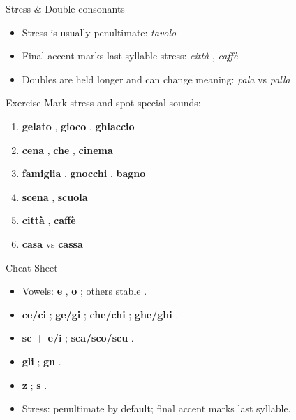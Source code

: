 \blueheader
\begin{frame}{Stress \& Double consonants}
\begin{itemize}
  \item Stress is usually penultimate: \textit{tavolo} \textipa{[ta"VOlo]}
  \item Final accent marks last-syllable stress: \textit{citt\`a} \textipa{[tSit"ta]}, \textit{caff\`e} \textipa{[kaf"fE]}
  \item Doubles are held longer and can change meaning: \textit{pala} \textipa{["pala]} vs \textit{palla} \textipa{["palla]}
\end{itemize}

\medskip
{}
\end{frame}

\cyanheader
\begin{frame}{Exercise}
Mark stress and spot special sounds:
\begin{enumerate}
  \item \textbf{gelato} , \textbf{gioco} \textipa{["dZOko]}, \textbf{ghiaccio} \textipa{["gjattSo]}
  \item \textbf{cena} \textipa{["tSe:na]}, \textbf{che} \textipa{[ke]}, \textbf{cinema} \textipa{["tSinema]}
  \item \textbf{famiglia} \textipa{[fa"miLa]}, \textbf{gnocchi} \textipa{["JOkki]}, \textbf{bagno} \textipa{["baJo]}
  \item \textbf{scena} \textipa{["Se:na]}, \textbf{scuola} \textipa{["skwOla]}
  \item \textbf{citt\`a} \textipa{[tSit"ta]}, \textbf{caff\`e} \textipa{[kaf"fE]}
  \item \textbf{casa} \textipa{["ka:za]} vs \textbf{cassa} \textipa{["kassa]}
\end{enumerate}
\end{frame}

\greenheader
\begin{frame}{Cheat-Sheet}
\begin{itemize}
  \item Vowels: \textbf{e} \textipa{[e]/[E]}, \textbf{o} \textipa{[o]/[O]}; others stable \textipa{[a,i,u]}.
  \item \textbf{ce/ci} \textipa{[tS]}; \textbf{ge/gi} \textipa{[dZ]}; \textbf{che/chi} \textipa{[k]}; \textbf{ghe/ghi} \textipa{[g]}.
  \item \textbf{sc + e/i} \textipa{[S]}; \textbf{sca/sco/scu} \textipa{[sk]}.
  \item \textbf{gli} \textipa{[L]}; \textbf{gn} \textipa{[J]}.
  \item \textbf{z} \textipa{[ts]/[dz]}; \textbf{s} \textipa{[s]/[z]}.
  \item Stress: penultimate by default; final accent marks last syllable.
\end{itemize}
\end{frame}

